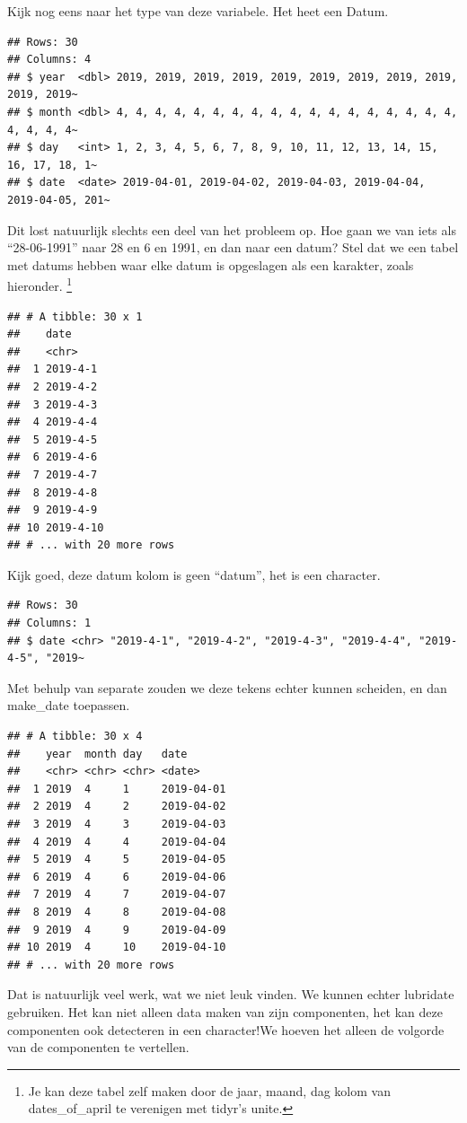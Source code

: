 \documentclass[]{tufte-book}
\begin{document}
Kijk nog eens naar het type van deze variabele. Het heet een Datum.

\begin{verbatim}
## Rows: 30
## Columns: 4
## $ year  <dbl> 2019, 2019, 2019, 2019, 2019, 2019, 2019, 2019, 2019, 2019, 2019~
## $ month <dbl> 4, 4, 4, 4, 4, 4, 4, 4, 4, 4, 4, 4, 4, 4, 4, 4, 4, 4, 4, 4, 4, 4~
## $ day   <int> 1, 2, 3, 4, 5, 6, 7, 8, 9, 10, 11, 12, 13, 14, 15, 16, 17, 18, 1~
## $ date  <date> 2019-04-01, 2019-04-02, 2019-04-03, 2019-04-04, 2019-04-05, 201~
\end{verbatim}

Dit lost natuurlijk slechts een deel van het probleem op. Hoe gaan we van iets als ``28-06-1991'' naar 28 en 6 en 1991, en dan naar een datum? Stel dat we een tabel met datums hebben waar elke datum is opgeslagen als een karakter, zoals hieronder. \footnote{Je kan deze tabel zelf maken door de jaar, maand, dag kolom van dates\_of\_april te verenigen met tidyr's unite.}

\begin{verbatim}
## # A tibble: 30 x 1
##    date     
##    <chr>    
##  1 2019-4-1 
##  2 2019-4-2 
##  3 2019-4-3 
##  4 2019-4-4 
##  5 2019-4-5 
##  6 2019-4-6 
##  7 2019-4-7 
##  8 2019-4-8 
##  9 2019-4-9 
## 10 2019-4-10
## # ... with 20 more rows
\end{verbatim}

Kijk goed, deze datum kolom is geen ``datum'', het is een character.

\begin{verbatim}
## Rows: 30
## Columns: 1
## $ date <chr> "2019-4-1", "2019-4-2", "2019-4-3", "2019-4-4", "2019-4-5", "2019~
\end{verbatim}

Met behulp van separate zouden we deze tekens echter kunnen scheiden, en dan make\_date toepassen.

\begin{verbatim}
## # A tibble: 30 x 4
##    year  month day   date      
##    <chr> <chr> <chr> <date>    
##  1 2019  4     1     2019-04-01
##  2 2019  4     2     2019-04-02
##  3 2019  4     3     2019-04-03
##  4 2019  4     4     2019-04-04
##  5 2019  4     5     2019-04-05
##  6 2019  4     6     2019-04-06
##  7 2019  4     7     2019-04-07
##  8 2019  4     8     2019-04-08
##  9 2019  4     9     2019-04-09
## 10 2019  4     10    2019-04-10
## # ... with 20 more rows
\end{verbatim}

Dat is natuurlijk veel werk, wat we niet leuk vinden. We kunnen echter lubridate gebruiken. Het kan niet alleen data maken van zijn componenten, het kan deze componenten ook detecteren in een character!We hoeven het alleen de volgorde van de componenten te vertellen.
\end{document}
